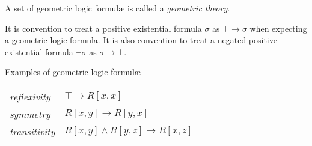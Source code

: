 		A set
		of geometric logic formul{\ae} is called a \emph{geometric theory}.

		It is convention to treat a positive existential formula $\sigma$ as
		$\top \to \sigma$ when expecting a geometric logic formula. It is also
		convention to treat a negated positive existential formula $\neg\sigma$
		as $\sigma \to \bot$.

		Examples of geometric logic formul{\ae}

		\begin{tabular}{ll}
		\emph{reflexivity}  \quad  &  $\top \to R[x,x]$                  \\
		\emph{symmetry}     \quad  &  $R[x,y] \to R[y,x]$                \\
		\emph{transitivity} \quad  &  $R[x,y] \wedge R[y,z] \to R[x,z]$  \\
		\end{tabular}
